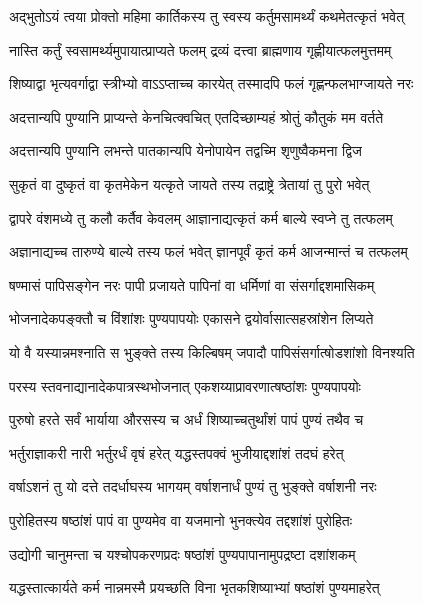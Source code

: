 \twolineshloka
{अद्भुतोऽयं त्वया प्रोक्तो महिमा कार्तिकस्य तु}
{स्वस्य कर्तुमसामर्थ्यं कथमेतत्कृतं भवेत्} %


\twolineshloka
{नास्ति कर्तुं स्वसामर्थ्यमुपायात्प्राप्यते फलम्}
{द्रव्यं दत्त्वा ब्राह्मणाय गृह्णीयात्फलमुत्तमम्} %

\twolineshloka
{शिष्याद्वा भृत्यवर्गाद्वा स्त्रीभ्यो वाऽऽप्ताच्च कारयेत्}
{तस्मादपि फलं गृह्णन्फलभाग्जायते नरः} %


\twolineshloka
{अदत्तान्यपि पुण्यानि प्राप्यन्ते केनचित्क्वचित्}
{एतदिच्छाम्यहं श्रोतुं कौतुकं मम वर्तते} %


\twolineshloka
{अदत्तान्यपि पुण्यानि लभन्ते पातकान्यपि}
{येनोपायेन तद्वच्मि शृणुष्वैकमना द्विज} %

\twolineshloka
{सुकृतं वा दुष्कृतं वा कृतमेकेन यत्कृते}
{जायते तस्य तद्राष्ट्रे त्रेतायां तु पुरो भवेत्} %

\twolineshloka
{द्वापरे वंशमध्ये तु कलौ कर्तैव केवलम्}
{आज्ञानाद्यत्कृतं कर्म बाल्ये स्वप्ने तु तत्फलम्} %

\twolineshloka
{अज्ञानाद्यच्च तारुण्ये बाल्ये तस्य फलं भवेत्}
{ज्ञानपूर्वं कृतं कर्म आजन्मान्तं च तत्फलम्} %

\twolineshloka
{षण्मासं पापिसङ्गेन नरः पापी प्रजायते}
{पापिनां वा धर्मिणां वा संसर्गाद्दशमासिकम्} %

\twolineshloka
{भोजनादेकपङ्क्तौ च विंशांशः पुण्यपापयोः}
{एकासने द्वयोर्वासात्सहस्रांशेन लिप्यते} %

\twolineshloka
{यो वै यस्यान्नमश्नाति स भुङ्क्ते तस्य किल्बिषम्}
{जपादौ पापिसंसर्गात्षोडशांशो विनश्यति} %

\twolineshloka
{परस्य स्तवनाद्यानादेकपात्रस्थभोजनात्}
{एकशय्याप्रावरणात्षष्ठांशः पुण्यपापयोः} %

\twolineshloka
{पुरुषो हरते सर्वं भार्याया औरसस्य च}
{अर्धं शिष्याच्चतुर्थांशं पापं पुण्यं तथैव च} %

\twolineshloka
{भर्तुराज्ञाकरी नारी भर्तुरर्धं वृषं हरेत्}
{यद्धस्तपक्वं भुजीयाद्दशांशं तदघं हरेत्} %

\twolineshloka
{वर्षाऽशनं तु यो दत्ते तदर्धाघस्य भागयम्}
{वर्षाशनार्धं पुण्यं तु भुङ्क्ते वर्षाशनी नरः} %

\twolineshloka
{पुरोहितस्य षष्ठांशं पापं वा पुण्यमेव वा}
{यजमानो भुनक्त्येव तद्दशांशं पुरोहितः} %

\twolineshloka
{उद्योगी चानुमन्ता च यश्चोपकरणप्रदः}
{षष्ठांशं पुण्यपापानामुपद्रष्टा दशांशकम्} %

\twolineshloka
{यद्धस्तात्कार्यते कर्म नान्नमस्मै प्रयच्छति}
{विना भृतकशिष्याभ्यां षष्ठांशं पुण्यमाहरेत्} %

